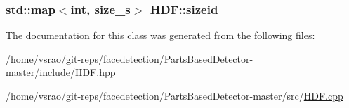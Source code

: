 \hypertarget{classHDF_ab47d2b1f7a374429d26ec54f15f4cea5}{
\subsubsection[{sizeid}]{\setlength{\rightskip}{0pt plus 5cm}std\-::map$<$int, {\bf size\-\_\-s}$>$ H\-D\-F\-::sizeid\hspace{0.3cm}{\ttfamily [private]}}}\label{classHDF_ab47d2b1f7a374429d26ec54f15f4cea5}


The documentation for this class was generated from the following files\-:\begin{DoxyCompactItemize}
\item 
/home/vsrao/git-\/reps/facedetection/\-Parts\-Based\-Detector-\/master/include/\hyperlink{HDF_8hpp}{H\-D\-F.\-hpp}\item 
/home/vsrao/git-\/reps/facedetection/\-Parts\-Based\-Detector-\/master/src/\hyperlink{HDF_8cpp}{H\-D\-F.\-cpp}\end{DoxyCompactItemize}

